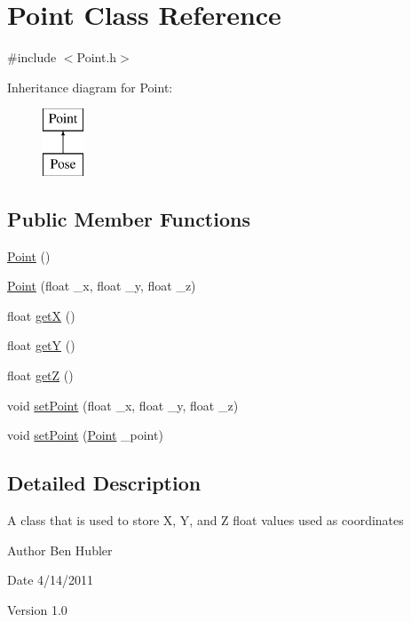 \hypertarget{class_point}{
\section{Point Class Reference}
\label{class_point}
}


{\ttfamily \#include $<$Point.h$>$}

Inheritance diagram for Point:\begin{figure}[H]
\begin{center}
\leavevmode
\includegraphics[height=2.000000cm]{class_point}
\end{center}
\end{figure}
\subsection*{Public Member Functions}
\begin{DoxyCompactItemize}
\item 
\hyperlink{class_point_ad92f2337b839a94ce97dcdb439b4325a}{Point} ()
\item 
\hyperlink{class_point_aef2feff94db53418730e802319eb4fe7}{Point} (float \_\-x, float \_\-y, float \_\-z)
\item 
float \hyperlink{class_point_acc27466778cc87a662bba40268c4c0c8}{getX} ()
\item 
float \hyperlink{class_point_a3cccbca94719ddde353cce86ce0e2f64}{getY} ()
\item 
float \hyperlink{class_point_adfd464bbfabdcecdcc14eb83cf6d2830}{getZ} ()
\item 
void \hyperlink{class_point_af2a602d5d53872fff27313639da37e3b}{setPoint} (float \_\-x, float \_\-y, float \_\-z)
\item 
void \hyperlink{class_point_ac2ef23aa700771edccd87a19b82104c9}{setPoint} (\hyperlink{class_point}{Point} \_\-point)
\end{DoxyCompactItemize}


\subsection{Detailed Description}
A class that is used to store X, Y, and Z float values used as coordinates \begin{DoxyAuthor}{Author}
Ben Hubler 
\end{DoxyAuthor}
\begin{DoxyDate}{Date}
4/14/2011 
\end{DoxyDate}
\begin{DoxyVersion}{Version}
1.0 
\end{DoxyVersion}


